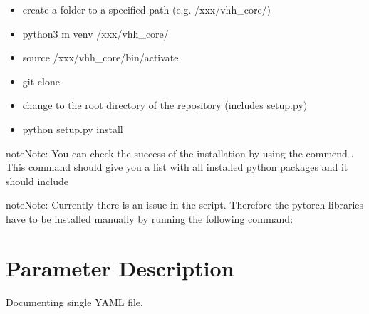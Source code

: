 \documentclass[letterpaper,10pt,english,openany,oneside]{sphinxmanual}
\begin{document}
\begin{itemize}
\item {} 
create a folder to a specified path (e.g. /xxx/vhh\_core/)

\item {} 
python3 \sphinxhyphen{}m venv /xxx/vhh\_core/

\end{itemize}

\begin{itemize}
\item {} 
source /xxx/vhh\_core/bin/activate

\end{itemize}

\begin{itemize}
\item {} 
git clone 

\end{itemize}

\begin{itemize}
\item {} 
change to the root directory of the repository (includes setup.py)

\item {} 
python setup.py install

\end{itemize}

\begin{sphinxadmonition}{note}{Note:}
You can check the success of the installation by using the commend . This command should give you a list with all installed python packages and it should include 
\end{sphinxadmonition}

\begin{sphinxadmonition}{note}{Note:}
Currently there is an issue in the  script. Therefore the pytorch libraries have to be installed manually by running the following command:
\end{sphinxadmonition}


\chapter{Parameter Description}
\label{\detokenize{index:parameter-description}}
Documenting single YAML file.
\end{document}
